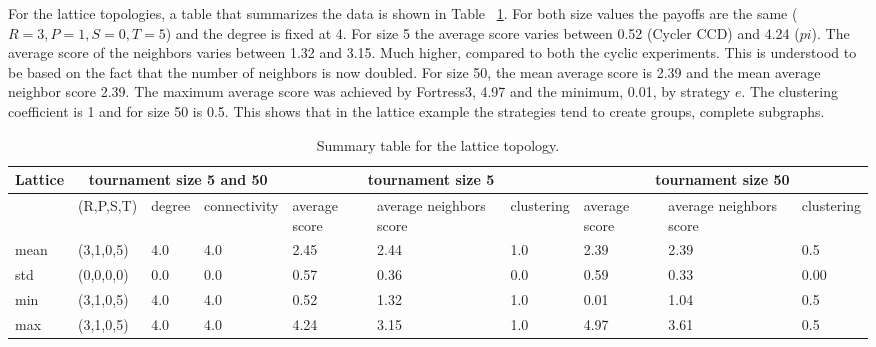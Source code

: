 For the lattice topologies, a table that summarizes the data is shown in Table
~\ref{sum-lattice}. For both size values the payoffs are the same (\(R=3, P=1,
S=0, T=5\)) and the degree is fixed at 4. For size 5 the average score
varies between 0.52 (Cycler CCD) and 4.24 ($pi$). The average score of the neighbors
varies between 1.32 and 3.15. Much higher, compared to both the cyclic experiments.
This is understood to be based on the fact that the number of neighbors is now
doubled. For size 50, the mean average score is 2.39 and the mean average neighbor
score 2.39. The maximum average score was achieved by Fortress3, 4.97 and the
minimum, 0.01, by strategy $e$. The clustering coefficient is 1 and for size
50 is 0.5. This shows that in the lattice example the strategies tend to create
groups, complete subgraphs.

\begin{table}[!hbtp]
	\centering
	\begin{adjustbox}{width=1\textwidth}
		\small
		\begin{tabular}{@{}|l|l|l|l|l|l|l|l|l|l|@{}}
			\toprule
			Lattice & \multicolumn{3}{c|}{tournament size 5 and 50} & \multicolumn{3}{c|}{tournament size 5} & \multicolumn{3}{c|}{tournament size 50}                            \\ \midrule
			     & (R,P,S,T) & degree & connectivity & average score & average neighbors score & clustering & average score & average neighbors score & clustering \\ \midrule
			mean & (3,1,0,5) & 4.0    & 4.0          & 2.45          & 2.44                    & 1.0        & 2.39          & 2.39                    & 0.5        \\ \midrule
			std  & (0,0,0,0) & 0.0    & 0.0          & 0.57          & 0.36                    & 0.0        & 0.59          & 0.33                    & 0.00       \\ \midrule
			min  & (3,1,0,5) & 4.0    & 4.0          & 0.52          & 1.32                    & 1.0        & 0.01          & 1.04                    & 0.5        \\ \midrule
			max  & (3,1,0,5) & 4.0    & 4.0          & 4.24          & 3.15                    & 1.0        & 4.97          & 3.61                    & 0.5        \\ \bottomrule
		\end{tabular}
	\end{adjustbox}
	\caption{Summary table for the lattice topology.}
	\label{sum-lattice}
\end{table}

